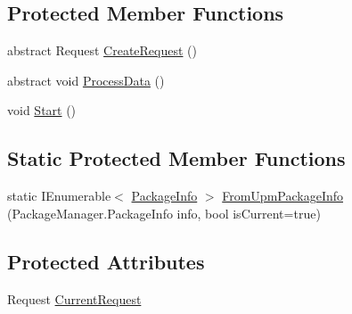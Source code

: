 \subsection*{Protected Member Functions}
\begin{DoxyCompactItemize}
\item 
abstract Request \mbox{\hyperlink{class_unity_editor_1_1_package_manager_1_1_u_i_1_1_upm_base_operation_ae4b93c7bf7b6eb994082e78cb146f793}{Create\+Request}} ()
\item 
abstract void \mbox{\hyperlink{class_unity_editor_1_1_package_manager_1_1_u_i_1_1_upm_base_operation_a5a4730e21b4cea1052e494cc5ca0eb84}{Process\+Data}} ()
\item 
void \mbox{\hyperlink{class_unity_editor_1_1_package_manager_1_1_u_i_1_1_upm_base_operation_ab1e89a04a3d2d224c3e167fc9d42092d}{Start}} ()
\end{DoxyCompactItemize}
\subsection*{Static Protected Member Functions}
\begin{DoxyCompactItemize}
\item 
static I\+Enumerable$<$ \mbox{\hyperlink{class_unity_editor_1_1_package_manager_1_1_u_i_1_1_package_info}{Package\+Info}} $>$ \mbox{\hyperlink{class_unity_editor_1_1_package_manager_1_1_u_i_1_1_upm_base_operation_a1b5f0339693904dce28d8a9935530fa8}{From\+Upm\+Package\+Info}} (Package\+Manager.\+Package\+Info info, bool is\+Current=true)
\end{DoxyCompactItemize}
\subsection*{Protected Attributes}
\begin{DoxyCompactItemize}
\item 
Request \mbox{\hyperlink{class_unity_editor_1_1_package_manager_1_1_u_i_1_1_upm_base_operation_afd2e01e03363616313513a57f74211d8}{Current\+Request}}
\end{DoxyCompactItemize}
